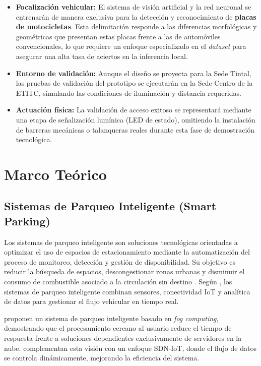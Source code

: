\documentclass[12pt, letterpaper]{article}
\begin{document}
\begin{itemize}
    \item \textbf{Focalización vehicular:} El sistema de visión artificial y la red neuronal se entrenarán de manera exclusiva para la detección y reconocimiento de \textbf{placas de motocicletas}. Esta delimitación responde a las diferencias morfológicas y geométricas que presentan estas placas frente a las de automóviles convencionales, lo que requiere un enfoque especializado en el \textit{dataset} para asegurar una alta tasa de aciertos en la inferencia local.
    \item \textbf{Entorno de validación:} Aunque el diseño se proyecta para la Sede Tintal, las pruebas de validación del prototipo se ejecutarán en la Sede Centro de la ETITC, simulando las condiciones de iluminación y distancia requeridas.
    \item \textbf{Actuación física:} La validación de acceso exitoso se representará mediante una etapa de señalización lumínica (LED de estado), omitiendo la instalación de barreras mecánicas o talanqueras reales durante esta fase de demostración tecnológica.
\end{itemize}

\section{Marco Teórico}

\subsection{Sistemas de Parqueo Inteligente (Smart Parking)}
Los sistemas de parqueo inteligente son soluciones tecnológicas orientadas a optimizar el uso de espacios de estacionamiento mediante la automatización del proceso de monitoreo, detección y gestión de disponibilidad. Su objetivo es reducir la búsqueda de espacios, descongestionar zonas urbanas y disminuir el consumo de combustible asociado a la circulación sin destino \parencite{alam2023survey}. Según \textcite{alam2023survey}, los sistemas de parqueo inteligente combinan sensores, conectividad IoT y analítica de datos para gestionar el flujo vehicular en tiempo real.

\textcite{celaya2020fog} proponen un sistema de parqueo inteligente basado en \textit{fog computing}, demostrando que el procesamiento cercano al usuario reduce el tiempo de respuesta frente a soluciones dependientes exclusivamente de servidores en la nube. \textcite{marshoodulla2024sdiotpark} complementan esta visión con un enfoque SDN-IoT, donde el flujo de datos se controla dinámicamente, mejorando la eficiencia del sistema.
\end{document}

